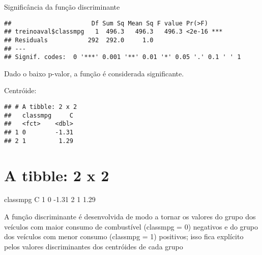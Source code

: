 \documentclass[]{article}
\newenvironment{Shaded}{\begin{snugshade}}{\end{snugshade}}
\newcommand{\KeywordTok}[1]{\textcolor[rgb]{0.13,0.29,0.53}{\textbf{#1}}}
\newcommand{\DataTypeTok}[1]{\textcolor[rgb]{0.13,0.29,0.53}{#1}}
\newcommand{\StringTok}[1]{\textcolor[rgb]{0.31,0.60,0.02}{#1}}
\newcommand{\OperatorTok}[1]{\textcolor[rgb]{0.81,0.36,0.00}{\textbf{#1}}}
\newcommand{\NormalTok}[1]{#1}
\begin{document}
Significância da função discriminante

\begin{Shaded}
\end{Shaded}

\begin{verbatim}
##                      Df Sum Sq Mean Sq F value Pr(>F)    
## treinoaval$classmpg   1  496.3   496.3   496.3 <2e-16 ***
## Residuals           292  292.0     1.0                   
## ---
## Signif. codes:  0 '***' 0.001 '**' 0.01 '*' 0.05 '.' 0.1 ' ' 1
\end{verbatim}

Dado o baixo p-valor, a função é considerada significante.

Centróide:

\begin{Shaded}
\end{Shaded}

\begin{verbatim}
## # A tibble: 2 x 2
##   classmpg     C
##   <fct>    <dbl>
## 1 0        -1.31
## 2 1         1.29
\end{verbatim}

\section{A tibble: 2 x 2}\label{a-tibble-2-x-2}

classmpg C 1 0 -1.31 2 1 1.29

A função discriminante é desenvolvida de modo a tornar os valores do
grupo dos veículos com maior consumo de combustível (classmpg = 0)
negativos e do grupo dos veículos com menor consumo (classmpg = 1)
positivos; isso fica explícito pelos valores discriminantes dos
centróides de cada grupo
\end{document}
